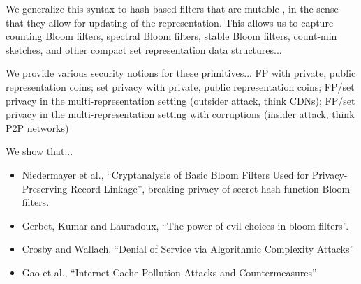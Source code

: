 We generalize this syntax to hash-based filters that are mutable
 , in the sense
that they allow for updating of the representation. This allows us
to capture counting Bloom filters, spectral Bloom filters, stable
Bloom filters, count-min sketches, and other compact set
representation data structures...

We provide various security notions for these primitives... FP with private, public representation coins; set privacy with private, public representation coins; FP/set privacy in the multi-representation setting (outsider attack, think CDNs); FP/set privacy in the multi-representation setting with corruptions (insider attack, think P2P networks) 


We show that...

\begin{itemize}
\item Niedermayer et al., ``Cryptanalysis of Basic Bloom Filters Used for Privacy-Preserving Record Linkage'', breaking privacy of secret-hash-function Bloom filters. 
\item Gerbet, Kumar and Lauradoux, ``The power of evil choices in bloom filters''.  
\item Crosby and Wallach, ``Denial of Service via Algorithmic Complexity Attacks'' 
\item Gao et al., ``Internet Cache Pollution Attacks and Countermeasures''
\end{itemize}

